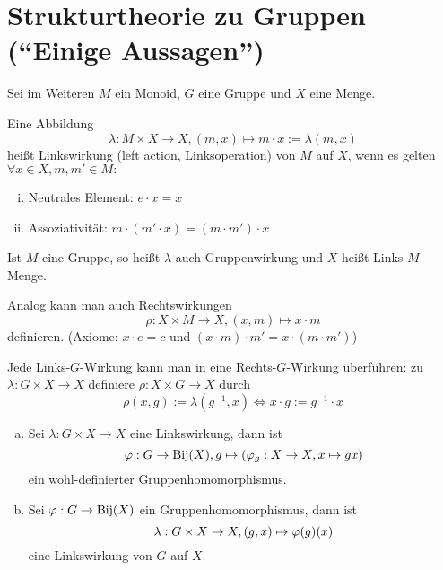 \documentclass[a4paper]{report}
\begin{document}
\section{Strukturtheorie zu Gruppen (``Einige Aussagen'')}
Sei im Weiteren $M$ ein Monoid, $G$ eine Gruppe und $X$ eine Menge.
\begin{defi}
  Eine Abbildung
  $$\lambda : M \times X \to X, (m,x) \mapsto m \cdot x := \lambda(m,x)$$
  heißt Linkswirkung (left action, Linksoperation) von $M$ auf $X$, wenn es gelten $\forall x \in X, m, m' \in M:$
  \begin{enumerate}[(i)]
    \item Neutrales Element: $e\cdot x = x$
    \item Assoziativität: $m\cdot (m'\cdot x) = (m\cdot m') \cdot x$
  \end{enumerate}
\end{defi}
\begin{bez*}
  Ist $M$ eine Gruppe, so heißt $\lambda$ auch Gruppenwirkung und $X$ heißt Links-$M$-Menge.
\end{bez*}
\begin{bem*} Analog kann man auch Rechtswirkungen
  $$\rho : X \times M \to X, (x,m) \mapsto x \cdot m$$
  definieren. (Axiome: $x\cdot e = c$ und $(x\cdot m)\cdot m' = x \cdot (m \cdot m')$)
\end{bem*}
\begin{bem*}[Übung]
  Jede Links-$G$-Wirkung kann man in eine Rechts-$G$-Wirkung überführen:
  zu $\lambda: G \times X \to X$ definiere $\rho : X \times G \to X$ durch
  $$\rho(x,g) := \lambda(g^{-1}, x) \iff x \cdot g := g^{-1} \cdot x$$
\end{bem*}
\begin{prop} \item
\begin{enumerate}[(a)]
  \item Sei $\lambda: G \times X \to X$ eine Linkswirkung, dann ist
        $$\varphi : G \to \operatorname{Bij}(X), g \mapsto (\varphi_{g}: X \to X, x \mapsto gx)$$
        ein wohl-definierter Gruppenhomomorphismus.
  \item Sei $\varphi : G \to \operatorname{Bij}(X)$ ein Gruppenhomomorphismus, dann ist
        $$\lambda: G \times X \to X, (g,x) \mapsto \varphi(g)(x)$$
        eine Linkswirkung von $G$ auf $X$.
\end{enumerate}
\end{prop}
\end{document}
